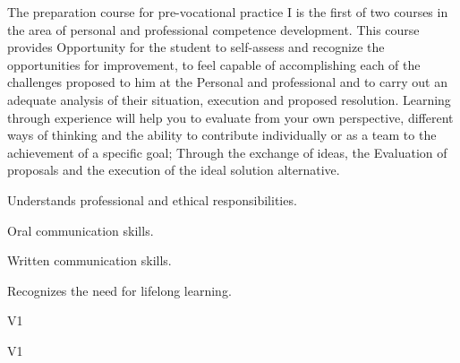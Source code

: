\begin{syllabus}


\begin{justification}
The preparation course for pre-vocational practice I is the first of two courses in the area of personal and professional competence development. This course provides
Opportunity for the student to self-assess and recognize the opportunities for improvement, to feel capable of accomplishing each of the challenges proposed to him at the
Personal and professional and to carry out an adequate analysis of their situation, execution and proposed resolution.
Learning through experience will help you to evaluate from your own perspective, different ways of thinking and the ability to contribute individually or as a team to the achievement of a specific goal; Through the exchange of ideas, the
Evaluation of proposals and the execution of the ideal solution alternative.

\end{justification}

\begin{goals}
    \item Understands professional and ethical responsibilities.
    \item Oral communication skills.
    \item Written communication skills.
    \item Recognizes the need for lifelong learning.
\end{goals}

\begin{outcomes}{V1}
    \item {} %
    \item {} %
    \item {} %
    \item {} %
\end{outcomes}

\begin{competences}{V1}
    \item {}
    \item {}
    \item {}
    \item {}
\end{competences}


\end{syllabus}
